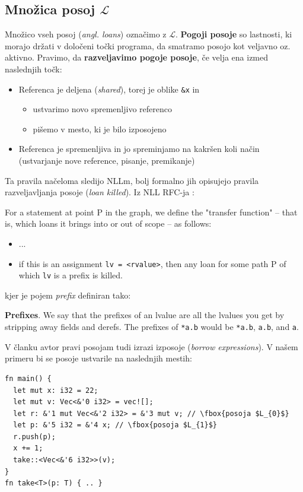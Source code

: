 \documentclass[a4paper,12pt,openright]{book}
\begin{document}
\subsection{Množica posoj $\mathcal{L}$}
Množico vseh posoj (\textit{angl. loans}) označimo z $\mathcal{L}$. \textbf{Pogoji posoje} so lastnosti, ki morajo
držati v določeni točki programa, da smatramo posojo kot veljavno oz. aktivno.
Pravimo, da \textbf{razveljavimo pogoje posoje}, če velja ena izmed naslednjih točk:
\begin{itemize}
	\item Referenca je deljena (\textit{shared}), torej je oblike \verb|&x| in
	      \begin{itemize}
		      \item ustvarimo novo spremenljivo referenco
		      \item pišemo v mesto, ki je bilo izposojeno
	      \end{itemize}
	\item Referenca je spremenljiva in jo spreminjamo na kakršen koli način (ustvarjanje nove reference, pisanje, premikanje)
\end{itemize}

Ta pravila načeloma sledijo NLLm, bolj formalno jih opisujejo pravila razveljavljanja posoje (\textit{loan killed}).
Iz NLL RFC-ja \cite{2094nllRustRFC}:
\begin{displayquote}
	For a statement at point P in the graph, we define the "transfer function" – that is,
	which loans it brings into or out of scope – as follows:
	\begin{itemize}
		\item ...
		\item if this is an assignment \verb|lv = <rvalue>|, then any loan for some path P of which \verb|lv| is a prefix is killed.
	\end{itemize}
\end{displayquote}

kjer je pojem \textit{prefix} definiran tako:
\begin{displayquote}
	\textbf{Prefixes}. We say that the prefixes of an lvalue are all the lvalues you get by stripping away fields and derefs.
	The prefixes of \verb|*a.b| would be \verb|*a.b|, \verb|a.b|, and \verb|a|.
\end{displayquote}

V članku avtor pravi posojam tudi izrazi izposoje (\textit{borrow expressions}). V našem primeru bi se posoje ustvarile na naslednjih
mestih:

\begin{listing}[!ht]
	\begin{verbatim}
fn main() {
  let mut x: i32 = 22;
  let mut v: Vec<&'0 i32> = vec![];
  let r: &'1 mut Vec<&'2 i32> = &'3 mut v; // \fbox{posoja $L_{0}$}
  let p: &'5 i32 = &'4 x; // \fbox{posoja $L_{1}$}
  r.push(p);
  x += 1;
  take::<Vec<&'6 i32>>(v);
}
fn take<T>(p: T) { .. }
\end{verbatim}
	\caption{Posoje v programu}
	\label{listing:loans}
\end{listing}
\end{document}
